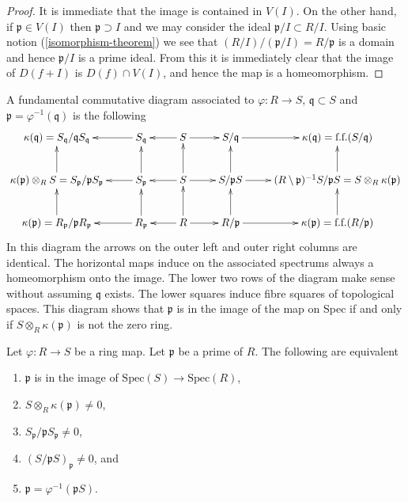 \begin{proof}
It is immediate that the image is contained in $V(I)$.
On the other hand, if $\mathfrak p \in V(I)$
then $\mathfrak p \supset I$ and we may consider
the ideal $\mathfrak p /I \subset R/I$. Using
basic notion (\ref{isomorphism-theorem}) we see that
$(R/I)/(\mathfrak p/I) = R/\mathfrak p$ is a domain
and hence $\mathfrak p/I$ is a prime ideal. From this
it is immediately clear that the image of $D(f + I)$
is $D(f) \cap V(I)$, and hence the map is a homeomorphism.
\end{proof}



\begin{remark}
\label{remark-fundamental-diagram}
A fundamental commutative diagram associated to
$\varphi : R \to S$,
$\mathfrak q \subset S$ and
$\mathfrak p = \varphi^{-1}(\mathfrak q)$ is
the following
$$
\xymatrix{
\kappa(\mathfrak q) = S_{\mathfrak q}/{\mathfrak q}S_{\mathfrak q}
&
S_{\mathfrak q} \ar[l]
&
S \ar[r] \ar[l]
&
S/\mathfrak q \ar[r]
&
\kappa(\mathfrak q) = \text{f.f.}(S/\mathfrak q)
\\
\kappa(\mathfrak p) \otimes_R S =
S_{\mathfrak p}/{\mathfrak p}S_{\mathfrak p} \ar[u]
&
S_{\mathfrak p} \ar[u] \ar[l]
&
S \ar[u] \ar[r] \ar[l]
&
S/\mathfrak pS \ar[u] \ar[r]
&
(R \setminus \mathfrak p)^{-1}S/\mathfrak pS =
S \otimes_R \kappa(\mathfrak p) \ar[u]
\\
\kappa(\mathfrak p) =
R_{\mathfrak p}/{\mathfrak p}R_{\mathfrak p} \ar[u]
&
R_{\mathfrak p} \ar[u] \ar[l]
&
R \ar[u] \ar[r] \ar[l]
&
R/\mathfrak p \ar[u] \ar[r]
&
\kappa(\mathfrak p) = \text{f.f.}(R/\mathfrak p) \ar[u]
}
$$
In this diagram the arrows on the outer left and outer right columns
are identical. The horizontal maps induce on the associated spectrums
always a homeomorphism onto the image. The lower two rows
of the diagram make sense without assuming $\mathfrak q$ exists.
The lower squares induce fibre squares of topological spaces.
This diagram shows that $\mathfrak p$ is in the image
of the map on Spec if and only if $S \otimes_R \kappa(\mathfrak p)$
is not the zero ring.
\end{remark}

\begin{lemma}
\label{lemma-in-image}
Let $\varphi : R \to S$ be a ring map. Let $\mathfrak p$
be a prime of $R$. The following are equivalent
\begin{enumerate}
\item $\mathfrak p$ is in the image of
$\text{Spec}(S) \to \text{Spec}(R)$,
\item $S \otimes_R \kappa(\mathfrak p) \not= 0$,
\item $S_{\mathfrak p}/\mathfrak p S_{\mathfrak p} \not = 0$,
\item $(S/\mathfrak pS)_{\mathfrak p} \not = 0$, and
\item $\mathfrak p = \varphi^{-1}(\mathfrak pS)$.
\end{enumerate}
\end{lemma}

